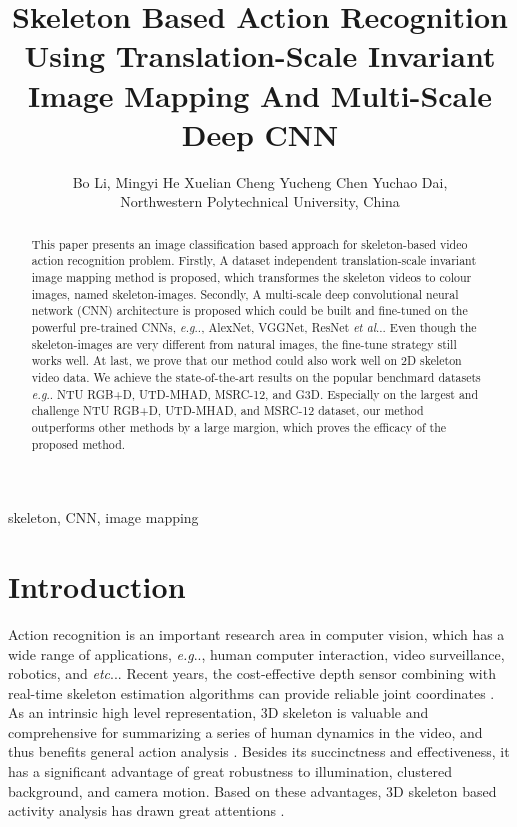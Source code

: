 \documentclass[10pt,journal]{IEEEtran}
\makeatletter
\DeclareRobustCommand\onedot{\futurelet\@let@token\@onedot}
\def\@onedot{\ifx\@let@token.\else.\null\fi\xspace}
\def\eg{\emph{e.g}\onedot} \def\Eg{\emph{E.g}\onedot}
\def\etc{\emph{etc}\onedot} \def\vs{\emph{vs}\onedot}
\def\etal{\emph{et al}\onedot}
\makeatother
\begin{document}
\title{Skeleton Based Action Recognition Using Translation-Scale Invariant Image Mapping And Multi-Scale Deep CNN}

\author{
Bo Li,
Mingyi He
Xuelian Cheng
Yucheng Chen
Yuchao Dai,

 Northwestern Polytechnical University, China
}

\maketitle

\begin{abstract}
This paper presents an image classification based approach for skeleton-based video action recognition problem. Firstly, A dataset independent translation-scale invariant image mapping method is proposed, which transformes the skeleton videos to colour images, named skeleton-images. Secondly, A multi-scale deep convolutional neural network (CNN) architecture is proposed which could be built  and fine-tuned on the powerful pre-trained CNNs, \eg, AlexNet, VGGNet, ResNet \etal. Even though the skeleton-images are very different from natural images, the fine-tune strategy still works well. 
At last, we prove that our method could also work well on 2D skeleton video data. We achieve the state-of-the-art results on the popular benchmard  datasets \eg NTU RGB+D, UTD-MHAD, MSRC-12, and G3D. Especially on the largest and challenge NTU RGB+D, UTD-MHAD, and MSRC-12 dataset, our method outperforms other methods by a large margion, which proves the efficacy of the proposed method.

\end{abstract}
\begin{IEEEkeywords}
skeleton, CNN, image mapping
\end{IEEEkeywords}

\section{Introduction}
\label{sec:intro}
Action recognition is an important research area in computer vision, which has a wide range of applications, \eg, human computer interaction, video surveillance, robotics, and \etc. Recent years, the cost-effective depth sensor combining with real-time skeleton estimation algorithms can provide reliable joint coordinates \cite{Shotton2013Efficient}. As an intrinsic high level representation, 3D skeleton is valuable and comprehensive for summarizing a series of human dynamics in the video, and thus benefits general action analysis \cite{Liu2017PKU}. Besides its succinctness and effectiveness, it has a significant advantage of great robustness to illumination, clustered background, and camera motion. Based on these advantages, 3D skeleton based activity analysis has drawn great attentions \cite{Zanfir2013The, Gowayyed2013Histogram, Vemulapalli2014Human, Vemulapalli2016Rolling, Ohnbar2013Joint, Du2015Hierarchical, Veeriah2015Differential, Zhu2016Co, Shahroudy2016NTU, Liu2016Spatio, Song2016An,Du2016Representation}.
\end{document}
